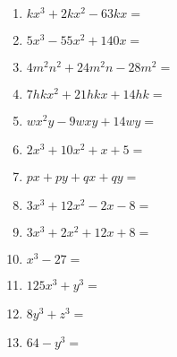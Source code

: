 \documentclass[a4paper,12pt]{article}
\begin{document}
\begin{enumerate}
\begin{enumerate}
      \item $kx^3 + 2kx^2 - 63kx = $
      \item $5x^3 - 55x^2 + 140x = $
      \item $4m^2n^2 + 24m^2n - 28m^2 = $
      \item $7hkx^2 + 21 hkx + 14hk = $
      \item $wx^2y - 9wxy + 14wy = $
      \item $2x^3 + 10x^2 + x + 5 = $ 
      \item $px + py + qx + qy = $
      \item $3x^3 + 12x^2 - 2x - 8 = $
      \item $3x^3 + 2x^2 + 12x + 8 = $
      \item $x^3 - 27 = $
      \item $125x^3 + y^3 = $
      \item $8y^3 + z^3 = $
      \item $64 - y^3 = $
    \end{enumerate}


\end{enumerate}
\end{document}
